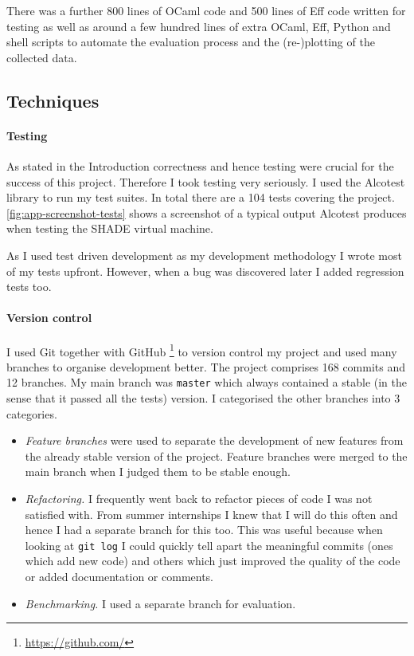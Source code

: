 \documentclass[class=article, crop=false]{standalone}
\begin{document}
There was a further 800 lines of OCaml code and 500 lines of Eff code written
for testing as well as around a few hundred lines of extra OCaml, Eff, Python
and shell scripts to automate the evaluation process and the (re-)plotting of
the collected data.


\subsection{Techniques}
\paragraph{Testing}

As stated in the Introduction correctness and hence testing were crucial for
the success of this project. Therefore I took testing very seriously. I used the
Alcotest library to run my test suites. In total there are a 104 tests covering
the project. \autoref{fig:app-screenshot-tests} shows a screenshot of a typical output Alcotest
produces when testing the SHADE virtual machine.

As I used test driven development as my development methodology I wrote most of
my tests upfront. However, when a bug was discovered later I added regression
tests too.

\paragraph{Version control}

I used Git together with GitHub%
\footnote{\url{https://github.com/}}
to version control my project and used many branches to organise development
better. The project comprises 168 commits and 12 branches.
My main branch was \verb|master| which always contained a stable (in
the sense that it passed all the tests) version. I categorised the other
branches into 3 categories.

\begin{itemize}
\item
\emph{Feature branches} were used to separate the development of new
features from the already stable version of the project. Feature branches were 
merged to the main branch when I judged them to be stable enough.

\item 
\emph{Refactoring.} I frequently went back to refactor pieces of code I was
not satisfied with. From summer internships I knew that I will do this often
and hence I had a separate branch for this too. This was useful because when
looking at \verb|git log| I could quickly tell apart the meaningful commits
(ones which add new code) and others which just improved the quality of the
code or added documentation or comments.

\item
\emph{Benchmarking.} I used a separate branch for evaluation.
\end{itemize}
\end{document}
